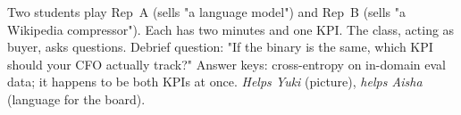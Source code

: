 \begin{activity}[title={Activity 4 --- Two-vendors role-play}]
Two students play Rep~A (sells "a language model") and Rep~B
(sells "a Wikipedia compressor").  Each has two minutes and one
KPI.  The class, acting as buyer, asks questions.  Debrief
question: "If the binary is the same, which KPI should your CFO
actually track?"  Answer keys: cross-entropy on in-domain eval
data; it happens to be both KPIs at once.  \emph{Helps Yuki}
(picture), \emph{helps Aisha} (language for the board).
\end{activity}

